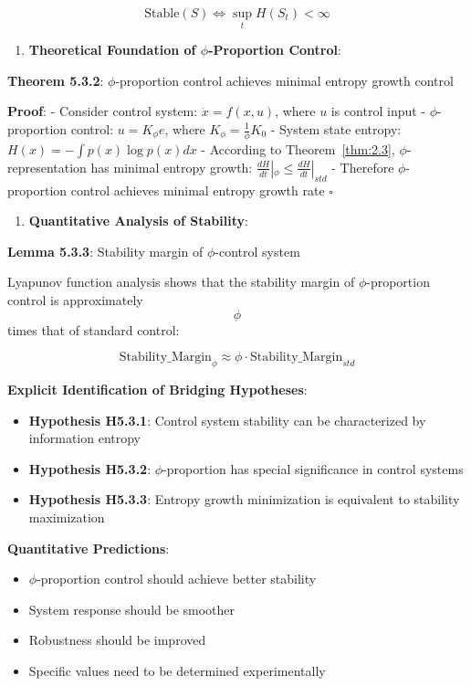 \begin{equation}
\text{Stable}(S) \Leftrightarrow \sup_t H(S_t) < \infty
\end{equation}

\begin{enumerate}
\item \textbf{Theoretical Foundation of $\phi$-Proportion Control}:
\end{enumerate}
   \textbf{Theorem 5.3.2}: $\phi$-proportion control achieves minimal entropy growth control
\label{thm:5.3.2}
   
   \textbf{Proof}:
   - Consider control system: $\dot{x} = f(x, u)$, where $u$ is control input
   - $\phi$-proportion control: $u = K_\phi e$, where $K_\phi = \frac{1}{\phi}K_0$
   - System state entropy: $H(x) = -\int p(x) \log p(x) dx$
   - According to Theorem~\ref{thm:2.3}, $\phi$-representation has minimal entropy growth: $\frac{dH}{dt}|_\phi \leq \frac{dH}{dt}|_{std}$
   - Therefore $\phi$-proportion control achieves minimal entropy growth rate $\square$

\begin{enumerate}
\item \textbf{Quantitative Analysis of Stability}:
\end{enumerate}
   \textbf{Lemma 5.3.3}: Stability margin of $\phi$-control system
\label{lemma:5.3.3}
   
   Lyapunov function analysis shows that the stability margin of $\phi$-proportion control is approximately $$\phi$$ times that of standard control:
   
\begin{equation}
\text{Stability\_Margin}_{\phi} \approx \phi \cdot \text{Stability\_Margin}_{std}
\end{equation}

\textbf{Explicit Identification of Bridging Hypotheses}:
\begin{itemize}
\item \textbf{Hypothesis H5.3.1}: Control system stability can be characterized by information entropy
\item \textbf{Hypothesis H5.3.2}: $\phi$-proportion has special significance in control systems
\item \textbf{Hypothesis H5.3.3}: Entropy growth minimization is equivalent to stability maximization
\end{itemize}

\textbf{Quantitative Predictions}:
\begin{itemize}
\item $\phi$-proportion control should achieve better stability
\item System response should be smoother
\item Robustness should be improved
\item Specific values need to be determined experimentally
\end{itemize}

